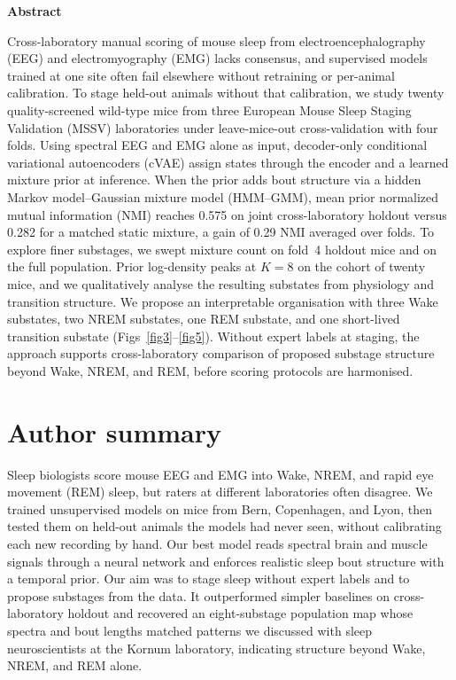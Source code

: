 \documentclass[10pt,letterpaper]{article}
\newif\ifreportmode
\newif\ifreportmode
\begin{document}
\begin{center}
\begin{minipage}{0.92\linewidth}
\begin{center}
\ifreportmode{\large\scshape Abstract}\else{\large\bfseries Abstract}\fi
\end{center}
\vspace{0.35em}
\justifying
\noindent
Cross-laboratory manual scoring of mouse sleep from electroencephalography (EEG) and electromyography (EMG) lacks consensus, and supervised models trained at one site often fail elsewhere without retraining or per-animal calibration.
To stage held-out animals without that calibration, we study twenty quality-screened wild-type mice from three European Mouse Sleep Staging Validation (MSSV) laboratories under leave-mice-out cross-validation with four folds.
Using spectral EEG and EMG alone as input, decoder-only conditional variational autoencoders (cVAE) assign states through the encoder and a learned mixture prior at inference.
When the prior adds bout structure via a hidden Markov model--Gaussian mixture model (HMM--GMM), mean prior normalized mutual information (NMI) reaches 0.575 on joint cross-laboratory holdout versus 0.282 for a matched static mixture, a gain of 0.29 NMI averaged over folds.
To explore finer substages, we swept mixture count on fold~4 holdout mice and on the full population. Prior log-density peaks at $K{=}8$ on the cohort of twenty mice, and we qualitatively analyse the resulting substates from physiology and transition structure. 
We propose an interpretable organisation with three Wake substates, two NREM substates, one REM substate, and one short-lived transition substate (Figs~\ref{fig3}--\ref{fig5}). 
Without expert labels at staging, the approach supports cross-laboratory comparison of proposed substage structure beyond Wake, NREM, and REM, before scoring protocols are harmonised.
\end{minipage}
\end{center}

\section*{Author summary}
Sleep biologists score mouse EEG and EMG into Wake, NREM, and rapid eye movement (REM) sleep, but raters at different laboratories often disagree.
We trained unsupervised models on mice from Bern, Copenhagen, and Lyon, then tested them on held-out animals the models had never seen, without calibrating each new recording by hand.
Our best model reads spectral brain and muscle signals through a neural network and enforces realistic sleep bout structure with a temporal prior.
Our aim was to stage sleep without expert labels and to propose substages from the data.
It outperformed simpler baselines on cross-laboratory holdout and recovered an eight-substage population map whose spectra and bout lengths matched patterns we discussed with sleep neuroscientists at the Kornum laboratory, indicating structure beyond Wake, NREM, and REM alone.
\end{document}
